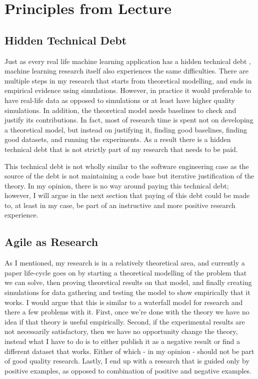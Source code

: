 \documentclass[pra, onecolumn,superscriptaddress,nofootinbib]{revtex4}
\begin{document}
\section{Principles from Lecture}
\subsection{Hidden Technical Debt}

    Just as every real life machine learning application has a hidden technical debt \cite{sculley2015}, machine learning research itself also experiences the same difficulties. There are multiple steps in my research that starts from theoretical modelling, and ends in empirical evidence using simulations. However, in practice it would preferable to have real-life data as opposed to simulations or at least have higher quality simulations. In addition, the theoretical model needs baselines to check and justify its contributions. In fact, most of research time is spent not on developing a theoretical model, but instead on justifying it, finding good baselines, finding good datasets, and running the experiments. As a result there is a hidden technical debt that is not strictly part of my research that needs to be paid. 

    This technical debt is not wholly similar to the software engineering case as the source of the debt is not maintaining a code base but iterative justification of the theory. In my opinion, there is no way around paying this technical debt; however, I will argue in the next section that paying of this debt could be made to, at least in my case, be part of an instructive and more positive research experience.
    
\subsection{Agile as Research}
    As I mentioned, my research is in a relatively theoretical area, and currently a paper life-cycle goes on by starting a theoretical modelling of the problem that we can solve, then proving theoretical results on that model, and finally creating simulations for data gathering and testing the model to show empirically that it works. I would argue that this is similar to a waterfall model for research and there a few problems with it. First, once we're done with the theory we have no idea if that theory is useful empirically. Second, if the experimental results are not necessarily satisfactory, then we have no opportunity change the theory, instead what I have to do is to either publish it as a negative result or find a different dataset that works. Either of which - in my opinion - should not be part of good quality research. Lastly, I end up with a research that is guided only by positive examples, as opposed to combination of positive and negative examples.  
\end{document}
